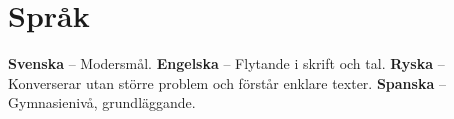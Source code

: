 \section*{Språk}

\begin{myindentpar}
  \textbf{Svenska} -- Modersmål.\quad
  \textbf{Engelska} -- Flytande i skrift och tal.\quad
  \textbf{Ryska} -- Konverserar utan större problem och förstår enklare texter.\quad
  \textbf{Spanska} -- Gymnasienivå, grundläggande.
\end{myindentpar}
